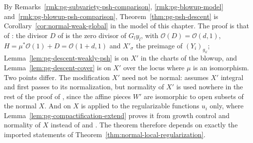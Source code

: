 \begin{remark}\label{rmk:pg-psh-descent-source}
By Remarks~\ref{rmk:pg-subvariety-psh-comparison}, \ref{rmk:pg-blowup-model} and~\ref{rmk:pg-blowup-psh-comparison}, Theorem~\ref{thm:pg-psh-descent}
is Corollary~\ref{cor:normal-weak-global} \cite[Corollary~5.26]{FHX} in the model of this chapter. The proof is that of \cite{FHX}: the
divisor $D$ of \cite{FHX} is the zero divisor of $G_ly_l$, with $\mathcal O(D)=\mathcal O(d,1)$, $H=\mu^*\mathcal O(1)+D=\mathcal O(1+d,1)$ and $X'_\sigma$ the preimage of
$(Y_i)_{g_{il}}$; Lemma~\ref{lem:pg-descent-weakly-psh} is \cite[Lemma~5.4(2)]{FHX} on $X'$ in the charts of the blowup, and
Lemma~\ref{lem:pg-descent-cover} is \cite[Lemma~5.10(1)]{FHX} on $X'$ over the locus where $\mu$ is an isomorphism. Two points differ. The
modification $X'$ need not be normal: \cite[Corollary~5.26]{FHX} assumes $X'$ integral and first passes to its normalization, but normality of $X'$ is used nowhere in the rest of the proof of \cite{FHX}, since the affine pieces
$W'$ are isomorphic to open subsets of the normal $X$. And \cite[Lemma~5.10(2)]{FHX} on $X$ is applied to the regularizable functions $u_i$ only, where
Lemma~\ref{lem:pg-compactification-extend} proves it from growth control and normality of $X$ instead of \cite[Lemma~5.5]{FHX} and
\cite{CLD12}. The theorem therefore depends on exactly the imported statements of Theorem~\ref{thm:normal-local-regularization}.
\end{remark}
